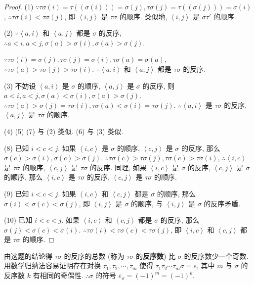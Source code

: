 \documentclass{ctexart}
\begin{document}
\begin{proof}
    (1) $\because\tau\sigma(i)=\tau((\sigma(i)))=\sigma(j),\tau\sigma(j)=\tau((\sigma(j)))=\sigma(i)$, $\therefore\tau\sigma(i)<\tau\sigma(j)$, 即 $\left<i,j\right>$ 是 $\tau\sigma$ 的顺序. 类似地, $\left<i,j\right>$ 是 $\sigma\tau'$ 的顺序.

    (2) $\because\left<a,i\right>$ 和 $\left<a,j\right>$ 都是 $\sigma$ 的反序, $\therefore a<i,a<j,\sigma(a)>\sigma(i),\sigma(a)>\sigma(j)$.

    $\because\tau\sigma(i)=\sigma(j),\tau\sigma(j)=\sigma(i),\tau\sigma(a)=\sigma(a)$, $\therefore\tau\sigma(a)>\tau\sigma(j)>\tau\sigma(i)$. $\therefore\left<a,i\right>$ 和 $\left<a,j\right>$ 都是 $\tau\sigma$ 的反序.

    (3) 不妨设 $\left<a,i\right>$ 是 $\sigma$ 的顺序, $\left<a,j\right>$ 是 $\sigma$ 的反序, 则 $a<i,a<j,\sigma(a)<\sigma(i),\sigma(a)>\sigma(j)$. $\therefore\tau\sigma(a)>\sigma(j)=\tau\sigma(i),\tau\sigma(a)<\sigma(i)=\tau\sigma(j)$. $\therefore\left<a,i\right>$ 是 $\tau\sigma$ 的反序, $\left<a,j\right>$ 是 $\tau\sigma$ 的顺序.

    (4) (5) (7) 与 (2) 类似. (6) 与 (3) 类似.

    (8) 已知 $i<c<j$. 如果 $\left<i,c\right>$ 是 $\sigma$ 的顺序, $\left<c,j\right>$ 是 $\sigma$ 的反序, 那么 $\sigma(c)>\sigma(i),\sigma(c)>\sigma(j)$. $\therefore\tau\sigma(c)>\tau\sigma(j),\tau\sigma(c)>\tau\sigma(i)$, $\therefore\left<i,c\right>$ 是 $\tau\sigma$ 的顺序, $\left<c,j\right>$ 是 $\tau\sigma$ 的反序. 同理, 如果 $\left<i,c\right>$ 是 $\sigma$ 的反序, $\left<c,j\right>$ 是 $\sigma$ 的顺序, 那么 $\left<i,c\right>$ 是 $\tau\sigma$ 的反序, $\left<c,j\right>$ 是 $\tau\sigma$ 的顺序.

    (9) 已知 $i<c<j$. 如果 $\left<i,c\right>$ 和 $\left<c,j\right>$ 都是 $\sigma$ 的顺序, 那么 $\sigma(i)<\sigma(c)<\sigma(j)$, 即 $\left<i,j\right>$ 是 $\sigma$ 的顺序, 与 $\left<i,j\right>$ 是 $\sigma$ 的反序矛盾.

    (10) 已知 $i<c<j$. 如果 $\left<i,c\right>$ 和 $\left<c,j\right>$ 都是 $\sigma$ 的反序, 那么 $\sigma(j)<\sigma(c)<\sigma(i)$. $\therefore\tau\sigma(i)<\tau\sigma(c)<\tau\sigma(j)$, 即 $\left<i,c\right>$ 和 $\left<c,j\right>$ 都是 $\tau\sigma$ 的顺序.
\end{proof}
\begin{note}
    由这题的结论得 $\tau\sigma$ 的反序的总数 (称为 $\tau\sigma$ 的\textbf{反序数}) 比 $\sigma$ 的反序数少一个奇数. 用数学归纳法容易证明存在对换 $\tau_1,\tau_2,\cdots,\tau_m$ 使得 $\tau_1\tau_2\cdots\tau_m\sigma=e$, 其中 $m$ 与 $\sigma$ 的反序数 $k$ 有相同的奇偶性. $\therefore\sigma$ 的符号 $\varepsilon_\sigma=(-1)^m=(-1)^k$.
\end{note}
\end{document}
